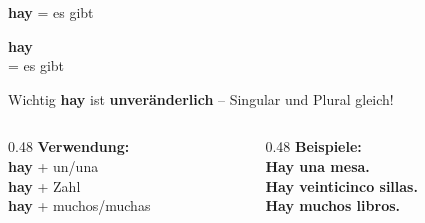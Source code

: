 \documentclass[aspectratio=169, 11pt]{beamer}
\newcommand{\es}[1]{\textbf{\textcolor{spanischrot}{#1}}}
\begin{document}
\begin{frame}{\es{hay} = es gibt}

\begin{center}
{\Huge \es{hay}}\\[0.3cm]
{\Large = es gibt}
\end{center}

\vspace{0.5cm}

\begin{block}{Wichtig}
\es{hay} ist \textbf{unveränderlich} -- Singular und Plural gleich!
\end{block}

\vspace{0.5cm}

\begin{columns}[T]
\begin{column}{0.48\textwidth}
\textbf{Verwendung:}\\[0.3em]
\es{hay} + un/una\\
\es{hay} + Zahl\\
\es{hay} + muchos/muchas
\end{column}

\begin{column}{0.48\textwidth}
\textbf{Beispiele:}\\[0.3em]
\es{Hay una mesa.}\\
\es{Hay veinticinco sillas.}\\
\es{Hay muchos libros.}
\end{column}
\end{columns}

\end{frame}
\end{document}
